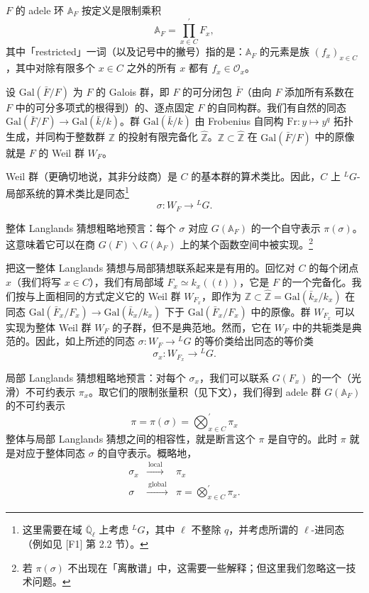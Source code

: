 \documentclass[11pt,a4paper]{article}
\begin{document}
$F$ 的 adele 环 $\mathbb{A}_F$ 按定义是限制乘积
\[
\mathbb{A}_F = \prod_{x\in C}^{\prime} F_x,
\]
其中「restricted」一词（以及记号中的撇号）指的是：$\mathbb{A}_F$ 的元素是族 $(f_x)_{x\in C}$，其中对除有限多个 $x\in C$ 之外的所有 $x$ 都有 $f_x\in\mathcal{O}_x$。

设 $\mathrm{Gal}(\bar F/F)$ 为 $F$ 的 Galois 群，即 $F$ 的可分闭包 $\bar F$（由向 $F$ 添加所有系数在 $F$ 中的可分多项式的根得到）的、逐点固定 $F$ 的自同构群。我们有自然的同态 $\mathrm{Gal}(\bar F/F)\to\mathrm{Gal}(\bar k/k)$。群 $\mathrm{Gal}(\bar k/k)$ 由 Frobenius 自同构 $\mathrm{Fr}: y\mapsto y^q$ 拓扑生成，并同构于整数群 $\mathbb{Z}$ 的投射有限完备化 $\widehat{\mathbb{Z}}$。$\mathbb{Z}\subset\widehat{\mathbb{Z}}$ 在 $\mathrm{Gal}(\bar F/F)$ 中的原像就是 $F$ 的 Weil 群 $W_F$。


Weil 群（更确切地说，其非分歧商）是 $C$ 的基本群的算术类比。因此，$C$ 上 ${}^{L}G$-局部系统的算术类比是同态\footnote{这里需要在域 $\overline{\mathbb{Q}}_\ell$ 上考虑 ${}^{L}G$，其中 $\ell$ 不整除 $q$，并考虑所谓的 $\ell$-进同态（例如见 [F1] 第 2.2 节）。}
\[
\sigma: W_F\to {}^{L}G.
\]

整体 Langlands 猜想粗略地预言：每个 $\sigma$ 对应 $G(\mathbb{A}_F)$ 的一个自守表示 $\pi(\sigma)$。这意味着它可以在商 $G(F)\backslash G(\mathbb{A}_F)$ 上的某个函数空间中被实现。\footnote{若 $\pi(\sigma)$ 不出现在「离散谱」中，这需要一些解释；但这里我们忽略这一技术问题。}

把这一整体 Langlands 猜想与局部猜想联系起来是有用的。回忆对 $C$ 的每个闭点 $x$（我们将写 $x\in C$），我们有局部域 $F_x\simeq k_x((t))$，它是 $F$ 的一个完备化。我们按与上面相同的方式定义它的 Weil 群 $W_{F_x}$，即作为 $\mathbb{Z}\subset\widehat{\mathbb{Z}}=\mathrm{Gal}(\bar k_x/k_x)$ 在同态 $\mathrm{Gal}(\bar F_x/F_x)\to\mathrm{Gal}(\bar k_x/k_x)$ 下于 $\mathrm{Gal}(\bar F_x/F_x)$ 中的原像。群 $W_{F_x}$ 可以实现为整体 Weil 群 $W_F$ 的子群，但不是典范地。然而，它在 $W_F$ 中的共轭类是典范的。因此，如上所述的同态 $\sigma: W_F\to {}^{L}G$ 的等价类给出同态的等价类
\[
\sigma_x: W_{F_x}\to {}^{L}G.
\]

局部 Langlands 猜想粗略地预言：对每个 $\sigma_x$，我们可以联系 $G(F_x)$ 的一个（光滑）不可约表示 $\pi_x$。取它们的限制张量积（见下文），我们得到 adele 群 $G(\mathbb{A}_F)$ 的不可约表示
\begin{equation}\tag{7.1}
\pi = \pi(\sigma) = \bigotimes_{x\in C}^{\prime}\pi_x
\end{equation}
整体与局部 Langlands 猜想之间的相容性，就是断言这个 $\pi$ 是自守的。此时 $\pi$ 就是对应于整体同态 $\sigma$ 的自守表示。概略地，
\[
\begin{array}{ccc}
\sigma_x & \xrightarrow{\ \text{local}\ } & \pi_x\\[3pt]
\sigma & \xrightarrow{\ \text{global}\ } & \pi = \bigotimes_{x\in C}^{\prime}\pi_x.
\end{array}
\]
\end{document}
